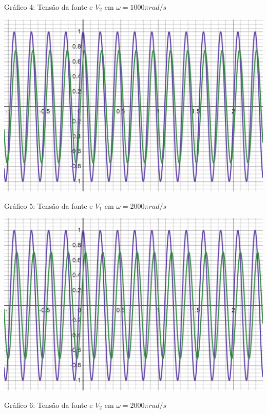 \documentclass[a4 paper]{article}
\begin{document}
\begin{center}
Gráfico 4: Tensão da fonte e $V_2$ em $\omega =1000\pi rad/s$
\end{center}

\begin{table}[h]
\centering
\includegraphics[scale=0.25]{rgadicoas/grafico3}
\end{table}

\newpage
\begin{center}
Gráfico 5: Tensão da fonte e $V_1$ em $\omega =2000\pi rad/s$
\end{center}

\vspace{30pt}
\begin{table}[h]
\centering
\includegraphics[scale=0.25]{rgadicoas/grafico7}
\end{table}

\begin{center}
Gráfico 6: Tensão da fonte e $V_2$ em $\omega =2000\pi rad/s$
\end{center}
\end{document}
